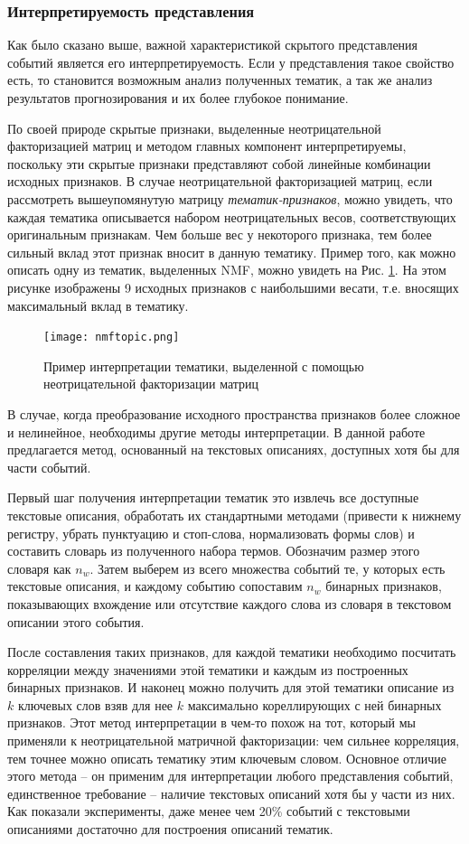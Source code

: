 \subsubsection{Интерпретируемость представления}
\label{subsub:interp}
Как было сказано выше, важной характеристикой скрытого представления событий является его интерпретируемость. Если у представления такое свойство есть, то становится возможным анализ полученных тематик, а так же анализ результатов прогнозирования и их более глубокое понимание.

По своей природе скрытые признаки, выделенные неотрицательной факторизацией матриц и методом главных компонент интерпретируемы, поскольку эти скрытые признаки представляют собой линейные комбинации исходных признаков. В случае неотрицательной факторизацией матриц, если рассмотреть вышеупомянутую матрицу \textit{тематик-признаков}, можно увидеть, что каждая тематика описывается набором неотрицательных весов, соответствующих оригинальным признакам. Чем больше вес у некоторого признака, тем более сильный вклад этот признак вносит в данную тематику. 
Пример того, как можно описать одну из тематик, выделенных NMF, можно увидеть на Рис. \ref{fig:nmf_topic}. На этом рисунке изображены 9 исходных признаков с наибольшими весати, т.е. вносящих максимальный вклад в тематику.
\begin{figure}
  \centering
  \texttt{[image: nmftopic.png]}
  \caption{Пример интерпретации тематики, выделенной с помощью неотрицательной факторизации матриц}
  \label{fig:nmf_topic}
\end{figure}

В случае, когда преобразование исходного пространства признаков более сложное и нелинейное, необходимы другие методы интерпретации.
В данной работе предлагается метод, основанный на текстовых описаниях, доступных хотя бы для части событий.

Первый шаг получения интерпретации тематик это извлечь все доступные текстовые описания, обработать их стандартными методами (привести к нижнему регистру, убрать пунктуацию и стоп-слова, нормализовать формы слов) и составить словарь из полученного набора термов. Обозначим размер этого словаря как $n_w$.
Затем выберем из всего множества событий те, у которых есть текстовые описания, и каждому событию сопоставим $n_w$ бинарных признаков, показывающих вхождение или отсутствие каждого слова из словаря в текстовом описании этого события.

После составления таких признаков, для каждой тематики необходимо посчитать корреляции между значениями этой тематики и каждым из построенных бинарных признаков. И наконец можно получить для этой тематики описание из $k$ ключевых слов взяв для нее $k$ максимально кореллирующих с ней бинарных признаков.
Этот метод интерпретации в чем-то похож на тот, который мы применяли к неотрицательной матричной факторизации: чем сильнее корреляция, тем точнее можно описать тематику этим ключевым словом. Основное отличие этого метода -- он применим для интерпретации любого представления событий, единственное требование -- наличие текстовых описаний хотя бы у части из них. Как показали эксперименты, даже менее чем 20\% событий с текстовыми описаниями достаточно для построения описаний тематик.

